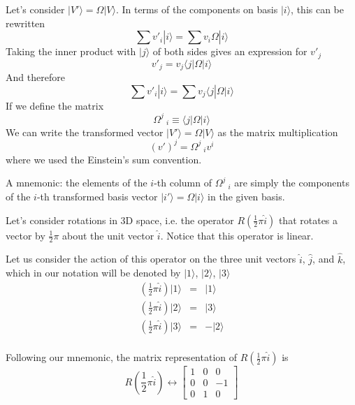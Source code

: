 \documentclass[11pt,fleqn]{book} %
\newcommand{\bra}[1]{\langle #1|}
\newcommand{\ket}[1]{| #1\rangle}
\begin{document}
Let's consider $\ket{V'}=\Omega\ket{V}$. In terms of the components on basis $\ket{i}$, this can be rewritten
\begin{equation*}
    \sum v'_i\ket{i} = \sum v_i\Omega\ket{i}
\end{equation*}
Taking the inner product with $\ket{j}$ of both sides gives an expression for $v'_j$
\begin{equation*}
    v'_j = v_j\bra{j}\Omega\ket{i}
\end{equation*}
And therefore
\begin{equation*}
    \sum v'_i\ket{i} = \sum v_j\bra{j}\Omega\ket{i}
\end{equation*}
If we define the matrix
\begin{equation}
    \label{eq:matrix_operator}
    \Omega^j\:_i\equiv \bra{j}\Omega\ket{i}
\end{equation}
We can write the transformed vector $\ket{V'}=\Omega\ket{V}$ as the matrix multiplication
\begin{equation}
    (v')^j=\Omega^j\:_iv^i    
\end{equation}
where we used the Einstein's sum convention.

\begin{remark}
    A mnemonic: the elements of the $i$-th column of $\Omega^j\:_i$ are simply the components of the $i$-th
transformed basis vector $\ket{i'}=\Omega\ket{i}$ in the given basis.
\end{remark}

\begin{example}
    Let's consider rotations in 3D space, i.e. the operator $R\left(\frac{1}{2}\pi \hat i\right)$ that rotates
    a vector by $\frac{1}{2}\pi$ about the unit vector $\hat i$. Notice that this operator is linear.
    
    Let us consider the action of this operator on the three unit vectors $\hat i$, $\hat j$, and $\hat k$, which
    in our notation will be denoted by $\ket{1}$, $\ket{2}$, $\ket{3}$
    \begin{eqnarray*}
        \left(\frac{1}{2}\pi \hat i\right)\ket{1} &=& \ket{1} \\
        \left(\frac{1}{2}\pi \hat i\right)\ket{2} &=& \ket{3} \\
        \left(\frac{1}{2}\pi \hat i\right)\ket{3} &=& -\ket{2} \\
    \end{eqnarray*}

    Following our mnemonic, the matrix representation of $R\left(\frac{1}{2}\pi \hat i\right)$ is
    \begin{equation*}
        R\left(\frac{1}{2}\pi \hat i\right) \leftrightarrow \left[\begin{array}{ccc}
            1&0&0\\
            0&0&-1\\
            0&1&0
        \end{array}\right]
    \end{equation*}
\end{example}
\end{document}
